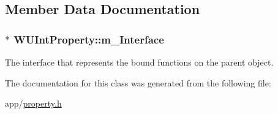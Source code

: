 \subsection{Member Data Documentation}
\hypertarget{class_w_u_int_property_aef61d929eea5c2e11c3ccf7e5921f564}{
\subsubsection[{m\-\_\-\-Interface}]{$\ast$ W\-U\-Int\-Property\-::m\-\_\-\-Interface\hspace{0.3cm}{\ttfamily [protected]}}}\label{class_w_u_int_property_aef61d929eea5c2e11c3ccf7e5921f564}
The interface that represents the bound functions on the parent object. 

The documentation for this class was generated from the following file\-:\begin{DoxyCompactItemize}
\item 
app/\hyperlink{property_8h}{property.\-h}\end{DoxyCompactItemize}
